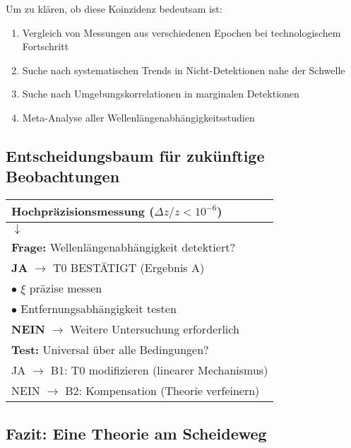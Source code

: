 \documentclass[12pt,a4paper]{article}
\theoremstyle{definition}
\begin{document}
	\begin{experiment}[title=Test der Koinzidenz]
		Um zu kl\"aren, ob diese Koinzidenz bedeutsam ist:
		\begin{enumerate}
			\item Vergleich von Messungen aus verschiedenen Epochen bei technologischem Fortschritt
			\item Suche nach systematischen Trends in Nicht-Detektionen nahe der Schwelle
			\item Suche nach Umgebungskorrelationen in marginalen Detektionen
			\item Meta-Analyse aller Wellenl\"angenabh\"angigkeitsstudien
		\end{enumerate}
	\end{experiment}
	
	\subsection{Entscheidungsbaum f\"ur zuk\"unftige Beobachtungen}
	
	\begin{center}
		\begin{tabular}{l}
			\textbf{Hochpr\"azisionsmessung} ($\Delta z/z < 10^{-6}$) \\
			\midrule
			$\downarrow$ \\
			\textbf{Frage:} Wellenl\"angenabh\"angigkeit detektiert? \\
			\midrule
			\textbf{JA} $\rightarrow$ T0 BEST\"ATIGT (Ergebnis A) \\
			\hspace{1cm} $\bullet$ $\xi$ pr\"azise messen \\
			\hspace{1cm} $\bullet$ Entfernungsabh\"angigkeit testen \\
			\midrule
			\textbf{NEIN} $\rightarrow$ Weitere Untersuchung erforderlich \\
			\hspace{1cm} \textbf{Test:} Universal \"uber alle Bedingungen? \\
			\hspace{2cm} JA $\rightarrow$ B1: T0 modifizieren (linearer Mechanismus) \\
			\hspace{2cm} NEIN $\rightarrow$ B2: Kompensation (Theorie verfeinern)
		\end{tabular}
	\end{center}
	
	\subsection{Fazit: Eine Theorie am Scheideweg}
	
\end{document}
